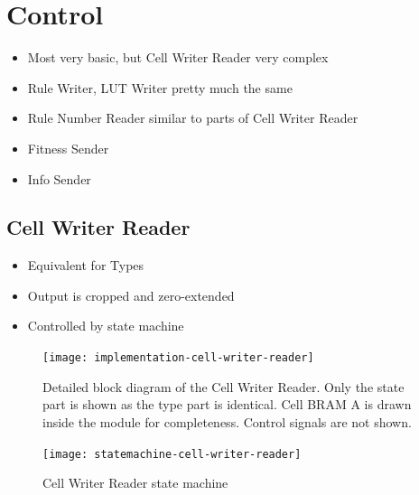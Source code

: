 


\section{Control}

\begin{itemize}
    \item Most very basic, but Cell Writer Reader very complex
    \item Rule Writer, LUT Writer pretty much the same
    \item Rule Number Reader similar to parts of Cell Writer Reader
    \item Fitness Sender
    \item Info Sender
\end{itemize}

\subsection{Cell Writer Reader}

\begin{itemize}
    \item Equivalent for Types
    \item Output is cropped and zero-extended
    \item Controlled by state machine
\end{itemize}

\begin{figure}[!ht]
    \centering
    \texttt{[image: implementation-cell-writer-reader]}
    \caption[Cell Writer Reader]{
        Detailed block diagram of the Cell Writer Reader.
        Only the state part is shown as the type part is identical.
        Cell BRAM A is drawn inside the module for completeness.
        Control signals are not shown.
    }
    \label{fig:implementation-cell-writer-reader}
\end{figure}

\begin{figure}[!ht]
    \centering
    \texttt{[image: statemachine-cell-writer-reader]}
    \caption{Cell Writer Reader state machine}
    \label{fig:statemachine-cell-writer-reader}
\end{figure}

